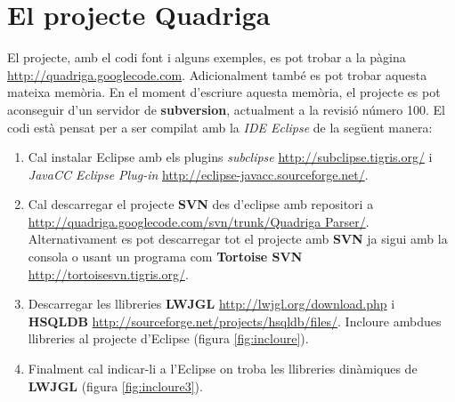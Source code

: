 \chapter{El projecte Quadriga}

El projecte, amb el codi font i alguns exemples, es pot trobar a la pàgina \url{http://quadriga.googlecode.com}. Adicionalment també es pot trobar aquesta mateixa memòria. En el moment d'escriure aquesta memòria, el projecte es pot aconseguir d'un servidor de {\bf subversion}, actualment a la revisió número 100. El codi està pensat per a ser compilat amb la {\em IDE Eclipse} de la següent manera:

\begin{enumerate}
  \item Cal instalar Eclipse amb els plugins {\em subclipse} \url{http://subclipse.tigris.org/} i {\em JavaCC Eclipse Plug-in} \url{http://eclipse-javacc.sourceforge.net/}.
  
  \item Cal descarregar el projecte {\bf SVN} des d'eclipse amb repositori a \url{http://quadriga.googlecode.com/svn/trunk/Quadriga Parser/}. \\
        Alternativament es pot descarregar tot el projecte amb {\bf SVN} ja sigui amb la consola o usant un programa com {\bf Tortoise SVN} \url{http://tortoisesvn.tigris.org/}.
        
  \item Descarregar les llibreries {\bf LWJGL} \url{http://lwjgl.org/download.php} i {\bf HSQLDB} \url{http://sourceforge.net/projects/hsqldb/files/}. 
        Incloure ambdues llibreries al projecte d'Eclipse (figura \ref{fig:incloure}).
        
  \item Finalment cal indicar-li a l'Eclipse on troba les llibreries dinàmiques de {\bf LWJGL} (figura \ref{fig:incloure3}).
\end{enumerate}

